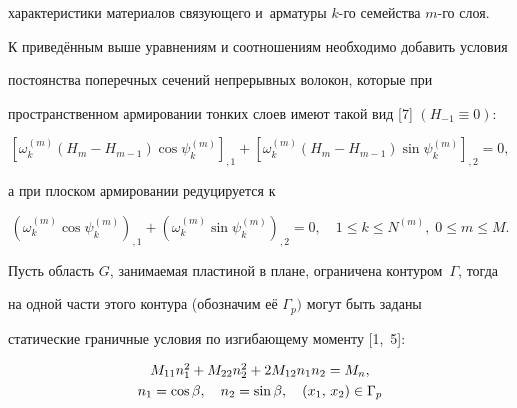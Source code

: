 характеристики материалов связующего и~арматуры $k$-го семейства $m$-го слоя.



К приведённым выше уравнениям и соотношениям необходимо добавить условия 

постоянства поперечных сечений непрерывных волокон, которые при 

пространственном армировании тонких слоев имеют такой вид [7] $(H_{ - 1} \equiv 0)$:

\begin{equation}

\label{nemir:eq7}

\left[ \omega _k^{(m)} \left( H_m - H_{m - 1}  \right)\cos \psi _k^{(m)}  \right]_{,1} + 

\left[ \omega _k^{(m)} \left( H_m - H_{m - 1}  \right)\sin \psi _k^{(m)}  \right]_{,2} = 

0,

\end{equation}

а при плоском армировании редуцируется к

\begin{equation}

\label{nemir:eq8}

\left( \omega _k^{(m)} \cos \psi _k^{(m)}  \right)_{,1} + 

\left( \omega _k^{(m)} \sin \psi _k^{(m)}  \right)_{,2} = 0,\quad 

1 \leqslant k \leqslant N^{(m)},\;0 \leqslant m \leqslant M.

\end{equation}



Пусть область $G$, занимаемая пластиной в плане, ограничена контуром~$\Gamma$, тогда 

на одной части этого контура (обозначим её $\Gamma _p)$ могут быть заданы 

статические граничные условия по изгибающему моменту [1,~5]:

\begin{equation}

\label{nemir:eq9}

\begin{array}{c}

M_{11} n_1^2 + M_{22} n_2^2 + 2M_{12} n_1 n_2 = M_n ,\vspace{1mm}\\

n_1 = \cos \beta,\quad n_2 = \sin \beta ,\quad 

(x_1 ,\,x_2 ) \in \Gamma _p 

\end{array}

\end{equation}


